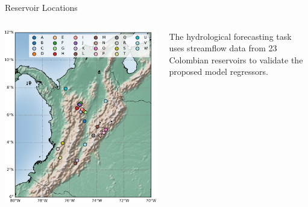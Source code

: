 \begin{frame}{Reservoir Locations}
	\begin{columns}[T] %
		\begin{column}{0.45\textwidth}
			\includegraphics[width=\linewidth]{images/colombiamap.pdf}
		\end{column}
		\begin{column}{0.55\textwidth}
			\vspace{50pt}
			\justifying %
			The hydrological forecasting task uses streamflow data from 23 Colombian reservoirs to validate the proposed model regressors.
		\end{column}
	\end{columns}
\end{frame}




